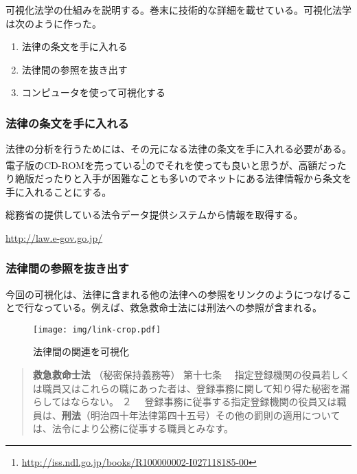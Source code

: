 \documentclass[a5j,openany,twoside]{jsbook}
\begin{document}
可視化法学の仕組みを説明する。巻末に技術的な詳細を載せている。可視化法学は次のように作った。

\begin{enumerate}
 \item 法律の条文を手に入れる
 \item 法律間の参照を抜き出す
 \item コンピュータを使って可視化する
\end{enumerate}

\subsubsection{法律の条文を手に入れる}

法律の分析を行うためには、その元になる法律の条文を手に入れる必要がある。電子版のCD-ROMを売っている\footnote{\url{http://iss.ndl.go.jp/books/R100000002-I027118185-00}}のでそれを使っても良いと思うが、高額だったり絶版だったりと入手が困難なことも多いのでネットにある法律情報から条文を手に入れることにする。

総務省の提供している法令データ提供システムから情報を取得する。

\url{http://law.e-gov.go.jp/}

\subsubsection{法律間の参照を抜き出す}

今回の可視化は、法律に含まれる他の法律への参照をリンクのようにつなげることで行なっている。例えば、救急救命士法には刑法への参照が含まれる。


\begin{wrapfigure}{l}{30mm}
 \begin{center}
  \texttt{[image: img/link-crop.pdf]}
  \caption{法律間の関連を可視化}
 \end{center}
\end{wrapfigure}

\begin{quote}

\textbf{救急救命士法}
（秘密保持義務等）
第十七条 　指定登録機関の役員若しくは職員又はこれらの職にあった者は、登録事務に関して知り得た秘密を漏らしてはならない。
２ 　登録事務に従事する指定登録機関の役員又は職員は、\textbf{刑法}（明治四十年法律第四十五号）その他の罰則の適用については、法令により公務に従事する職員とみなす。

\end{quote}
\end{document}
